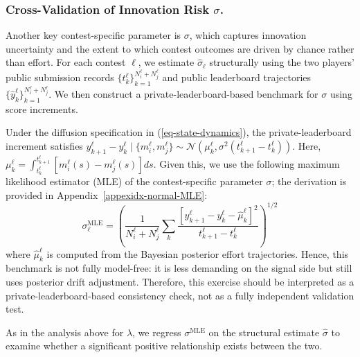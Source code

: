 \documentclass[mnsc]{informs3}
\begin{document}
\subsubsection{Cross-Validation of Innovation Risk $\sigma$.}
Another key contest-specific parameter is $\sigma$, which captures innovation uncertainty and the extent to which contest outcomes are driven by chance rather than effort.
For each contest $\ell$, we estimate $\hat{\sigma}_\ell$ structurally using the two players’ public submission records $\{t_k^\ell\}_{k=1}^{N_i^\ell+N_j^\ell}$ and public leaderboard trajectories $\{\hat y_k^\ell\}_{k=1}^{N_i^\ell+N_j^\ell}$.
We then construct a private-leaderboard-based benchmark for $\sigma$ using score increments.

Under the diffusion specification in (\ref{eq-state-dynamics}), the private-leaderboard increment satisfies
$y^\ell_{k+1} - y^\ell_{k} \mid \{m_i^\ell,m_j^\ell\} \sim \mathcal{N}\left(\mu^\ell_k, \sigma^2(t^\ell_{k+1}-t^\ell_k)\right)$.
Here, $\mu^\ell_k = \int^{t^\ell_{k+1}}_{t^\ell_k}\left[m^\ell_i(s) - m^\ell_j(s)\right]ds$.
Given this, we use the following maximum likelihood estimator (MLE) of the contest-specific parameter $\sigma$; the derivation is provided in Appendix~\ref{appexidx-normal-MLE}:
\begin{equation*}
\sigma^{\text{MLE}}_\ell = \left(\frac{1}{N^\ell_i+N^\ell_j}\sum_k\frac{\left[y^\ell_{k+1}-y^\ell_{k}-\hat\mu^\ell_k\right]^2}{t^\ell_{k+1}-t^\ell_k}\right)^{1/2}
\end{equation*}
where $\hat\mu^\ell_k$ is computed from the Bayesian posterior effort trajectories.
Hence, this benchmark is not fully model-free: it is less demanding on the signal side but still uses posterior drift adjustment.
Therefore, this exercise should be interpreted as a private-leaderboard-based consistency check, not as a fully independent validation test.

As in the analysis above for $\lambda$, we regress $\sigma^{\text{MLE}}$ on the structural estimate $\hat{\sigma}$ to examine whether a significant positive relationship exists between the two.
\end{document}
